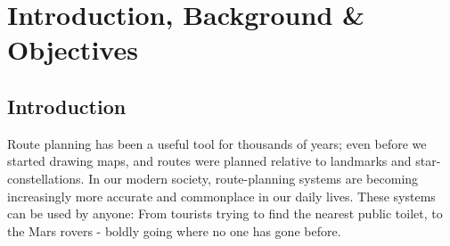 \chapter{Introduction, Background \& Objectives}



   
   


\section{Introduction}
Route planning has been a useful tool for thousands of years; even before we started drawing maps, and routes were planned relative to landmarks and star-constellations. In our modern society, route-planning systems are becoming increasingly more accurate and commonplace in our daily lives. These systems can be used by anyone: From tourists trying to find the nearest public toilet, to the Mars rovers\cite{marsRover} - boldly going where no one has gone before.

